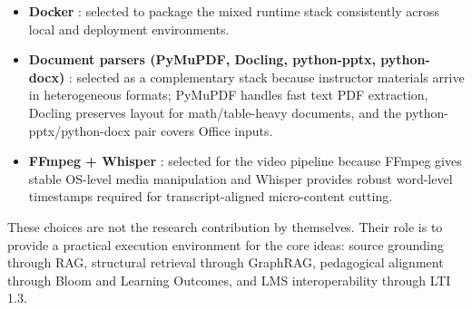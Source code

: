 \begin{itemize}
    \item \textbf{Docker} \cite{merkel2014docker}: selected to package the
          mixed runtime stack consistently across local and deployment
          environments.
    \item \textbf{Document parsers (PyMuPDF, Docling, python-pptx,
          python-docx)} \cite{mckennon2024pymupdf,docling2024,python_pptx2024,python_docx2024}:
          selected as a complementary stack because instructor materials
          arrive in heterogeneous formats; PyMuPDF handles fast text PDF
          extraction, Docling preserves layout for math/table-heavy
          documents, and the python-pptx/python-docx pair covers Office
          inputs.
    \item \textbf{FFmpeg + Whisper} \cite{tomar2006converting,radford2023robust}:
          selected for the video pipeline because FFmpeg gives stable
          OS-level media manipulation and Whisper provides robust
          word-level timestamps required for transcript-aligned
          micro-content cutting.
\end{itemize}

These choices are not the research contribution by themselves. Their role
is to provide a practical execution environment for the core ideas: source
grounding through RAG, structural retrieval through GraphRAG, pedagogical
alignment through Bloom and Learning Outcomes, and LMS interoperability
through LTI 1.3.
